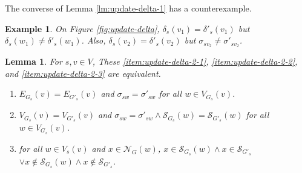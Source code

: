 \documentclass[twocolumn]{article}
\newtheorem{example}{Example}
\newtheorem{lemma}{Lemma}
\begin{document}
  The converse of Lemma \ref{lm:update-delta-1} has a counterexample.
  \begin{example}
    On Figure \ref{fig:update-delta},
    $\delta_s(v_1)=\delta'_s(v_1)$ but $\delta_s(w_1)\neq\delta'_s(w_1)$.
    Also, $\delta_s(v_2)=\delta'_s(v_2)$ but $\sigma_{sv_2}\neq\sigma'_{sv_2}$.
  \end{example}

  \begin{figure*}
    \centering
    \def\svgwidth{.45\linewidth}
    
    \caption{Counterexample of converse of Lemma \ref{lm:update-delta-1}.}
    \label{fig:update-delta}
  \end{figure*}

  \begin{lemma}
    \label{lm:update-delta-2}
    For $s,v\in V$, These \ref{item:update-delta-2-1}, \ref{item:update-delta-2-2}, and \ref{item:update-delta-2-3} are equivalent.
    \begin{enumerate}[label={\normalfont (\alph*)}]
    \item $E_{G_s}(v)=E_{G'_s}(v)$ and $\sigma_{sw}=\sigma'_{sw}$ for all $w\in V_{G_s}(v)$.
      \label{item:update-delta-2-1}
    \item $V_{G_s}(v)=V_{G'_s}(v)$ and $\sigma_{sw}=\sigma'_{sw}\land\mathcal{S}_{G_s}(w)=\mathcal{S}_{G'_s}(w)$ for all $w\in V_{G_s}(v)$.
      \label{item:update-delta-2-2}
    \item for all $w\in V_s(v)$ and $x\in\mathcal{N}_G(w)$,
      $x\in\mathcal{S}_{G_s}(w)\land x\in\mathcal{S}_{G'_s}$
      $\lor x\notin\mathcal{S}_{G_s}(w)\land x\notin\mathcal{S}_{G'_s}$.
      \label{item:update-delta-2-3}
    \end{enumerate}
  \end{lemma}
\end{document}
